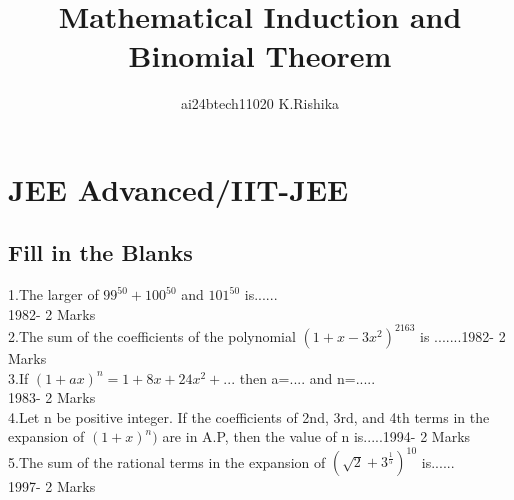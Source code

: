 \documentclass[journal,12pt,twocolumn]{IEEEtran}
\theoremstyle{remark}
\begin{document}

\vspace{3cm}

\title{Mathematical Induction and Binomial Theorem}
\author{ai24btech11020 K.Rishika}
\section{JEE Advanced/IIT-JEE}
\subsection{Fill in the Blanks}
\maketitle
1.The larger of $99^{50}+100^{50}$ and $101^{50}$ is......\\[2pt]{1982- 2 Marks}\\[6pt]
2.The sum of the coefficients of the polynomial $(1+x-3x^2)^2163$ is .......{1982- 2 Marks}\\[6pt]
3.If $(1+ax)^n=1+8x+24x^2+...$ then a=.... and n=.....\\[2pt]{1983- 2 Marks}\\[6pt]
4.Let n be positive integer. If the coefficients of 2nd, 3rd, and 4th terms in the expansion of $(1 + x)^n)$ are in A.P, then the value of n is.....{1994- 2 Marks}\\[6pt]
5.The sum of the rational terms in the expansion of $(\sqrt{2}+3^\frac{1}{5})^{10}$ is......\\[2pt]{1997- 2 Marks}





\newpage
\bigskip

\renewcommand{\thefigure}{\theenumi}
\renewcommand{\thetable}{\theenumi}
\end{document}
